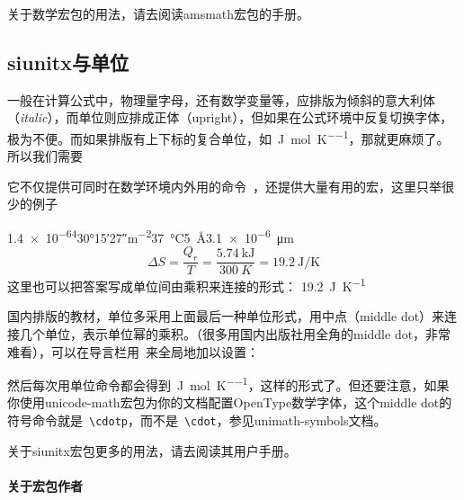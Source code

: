 \documentclass[a4paper,UTF8,zihao = -4]{ctexart} %
\begin{document}
关于数学宏包的用法，请去阅读\textsf{amsmath}宏包的手册。


\subsection{\textsf{siunitx}与单位}
\label{sec:unitPkg}

一般在计算公式中，物理量字母，还有数学变量等，应排版为倾斜的意大利体（\textit{italic}），而单位则应排成正体（upright），但如果在公式环境中反复切换字体，极为不便。而如果排版有上下标的复合单位，如~\si{\joule\per\mole\per\kelvin}，那就更麻烦了。所以我们需要

\begin{dispListing}
\usepackage{siunitx}
\end{dispListing}
它不仅提供可同时在数学环境内外用的命令~，还提供大量有用的宏，这里只举很少的例子

\begin{dispExample}
\num{1.4e-64}\quad \ang{30;15;27}\quad \si{m^{-2}}\quad \SI{37}{\celsius}\quad \SI{5}{\angstrom}\quad \SI{3.1e-6}{\micro\meter}
\[
  \Delta S = \dfrac{Q_r}{T} = \dfrac{\SI{5.74}{\kilo\joule}}{\SI{300}{K}} = \SI{19.2}{\joule\per\kelvin}
\]
这里也可以把答案写成单位间由乘积来连接的形式：
\SI[inter-unit-product = \ensuremath{{}\cdot{}}]{19.2}{\joule\per\kelvin}
\end{dispExample}

国内排版的教材，单位多采用上面最后一种单位形式，用中点（middle dot）来连接几个单位，表示单位幂的乘积。（很多用国内出版社用全角的middle dot，非常难看），可以在导言栏用~来全局地加以设置：

\begin{dispListing}
\usepackage{situnix}
\end{dispListing}

然后每次用单位命令都会得到~\si[inter-unit-product = \ensuremath{{}\cdot{}}]{\joule\per\mole\per\kelvin}，这样的形式了。但还要注意，如果你使用\textsf{unicode-math}宏包为你的文档配置OpenType数学字体，这个middle dot的符号命令就是~\verb|\cdotp|，而不是~\verb|\cdot|，参见\textsf{unimath-symbols}文档。

关于\textsf{siunitx}宏包更多的用法，请去阅读其用户手册。

\paragraph{关于宏包作者}
\end{document}
